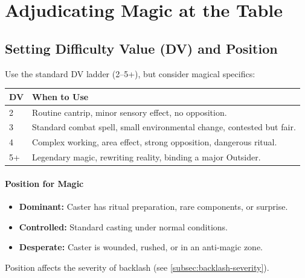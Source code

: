 \section{Adjudicating Magic at the Table}
\label{sec:magic-adjudication}

\subsection*{Setting Difficulty Value (DV) and Position}
Use the standard DV ladder (2–5+), but consider magical specifics:

\begin{tcolorbox}[title=DV for Magic, colback=white!97!gray, colframe=black!80!gray]
\begin{tabularx}{\textwidth}{lX}
\toprule
\textbf{DV} & \textbf{When to Use} \\
\midrule
2 & Routine cantrip, minor sensory effect, no opposition. \\
3 & Standard combat spell, small environmental change, contested but fair. \\
4 & Complex working, area effect, strong opposition, dangerous ritual. \\
5+ & Legendary magic, rewriting reality, binding a major Outsider. \\
\bottomrule
\end{tabularx}
\end{tcolorbox}

\paragraph{Position for Magic}
\begin{itemize}
  \item \textbf{Dominant:} Caster has ritual preparation, rare components, or surprise.
  \item \textbf{Controlled:} Standard casting under normal conditions.
  \item \textbf{Desperate:} Caster is wounded, rushed, or in an anti‑magic zone.
\end{itemize}
Position affects the severity of backlash (see \ref{subsec:backlash-severity}).

